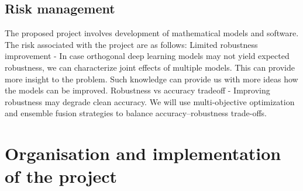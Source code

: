 \documentclass[a4paper,11pt]{article}
\begin{document}
\subsection{Risk management}
The proposed project involves development of mathematical models and software. The risk associated with the project are as follows:
Limited robustness improvement - In case orthogonal deep learning models may not yield expected robustness, we can characterize joint effects of multiple models. This can provide more insight to the problem. Such knowledge can provide us with more ideas how the models can be improved. 
Robustness vs accuracy tradeoff - Improving robustness may degrade clean accuracy. We will use multi-objective optimization and ensemble fusion strategies to balance accuracy–robustness trade-offs.



\section{Organisation and implementation of the project}
\end{document}
